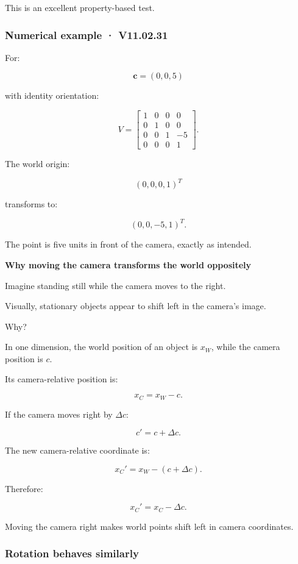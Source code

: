 This is an excellent property-based test.

\subsubsection{Numerical example · V11.02.31}\label{02-foundations-ii-ch032-numerical-example-v11.02.31}

\hypertarget{02-foundations-ii-ch032-numerical-example-v11.02.31}{}

For:

\[
 \mathbf c=(0,0,5)
\]

with identity orientation:

\[
 \boxed{ V= \begin{bmatrix} 1&0&0&0\\ 0&1&0&0\\ 0&0&1&-5\\ 0&0&0&1 \end{bmatrix} }.
\]

The world origin:

\[
 (0,0,0,1)^T
\]

transforms to:

\[
 \boxed{(0,0,-5,1)^T}.
\]

The point is five units in front of the camera, exactly as intended.

\textbf{Why moving the camera transforms the world oppositely}

Imagine standing still while the camera moves to the right.

Visually, stationary objects appear to shift left in the camera's image.

Why?

In one dimension, the world position of an object is \(x_W\), while the camera position is \(c\).

Its camera-relative position is:

\[
 \boxed{x_C=x_W-c}.
\]

If the camera moves right by \(\Delta c\):

\[
 c'=c+\Delta c.
\]

The new camera-relative coordinate is:

\[
 x_C'=x_W-(c+\Delta c).
\]

Therefore:

\[
 \boxed{x_C'=x_C-\Delta c}.
\]

Moving the camera right makes world points shift left in camera coordinates.

\subsubsection{Rotation behaves similarly}\label{02-foundations-ii-ch032-rotation-behaves-similarly}

